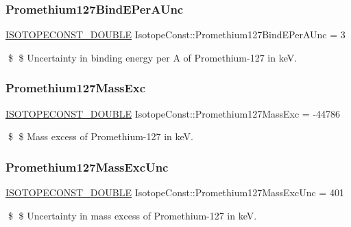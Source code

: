 \subsubsection{\texorpdfstring{Promethium127\+Bind\+E\+Per\+A\+Unc}{Promethium127BindEPerAUnc}}
{\footnotesize\ttfamily \mbox{\hyperlink{group___isotope_const-_macros_ga8f45a7272ce02c0b4c65c44636ed719a}{I\+S\+O\+T\+O\+P\+E\+C\+O\+N\+S\+T\+\_\+\+D\+O\+U\+B\+LE}} Isotope\+Const\+::\+Promethium127\+Bind\+E\+Per\+A\+Unc = 3}

\$ \$ Uncertainty in binding energy per A of Promethium-\/127 in keV. \mbox{\label{group___isotope_const-_promethium-_pm127_ga12c618d8406d4ec367de1925860785ff}} 
\subsubsection{\texorpdfstring{Promethium127\+Mass\+Exc}{Promethium127MassExc}}
{\footnotesize\ttfamily \mbox{\hyperlink{group___isotope_const-_macros_ga8f45a7272ce02c0b4c65c44636ed719a}{I\+S\+O\+T\+O\+P\+E\+C\+O\+N\+S\+T\+\_\+\+D\+O\+U\+B\+LE}} Isotope\+Const\+::\+Promethium127\+Mass\+Exc = -\/44786}

\$ \$ Mass excess of Promethium-\/127 in keV. \mbox{\label{group___isotope_const-_promethium-_pm127_ga92eadd91036a4d0863725507d2215783}} 
\subsubsection{\texorpdfstring{Promethium127\+Mass\+Exc\+Unc}{Promethium127MassExcUnc}}
{\footnotesize\ttfamily \mbox{\hyperlink{group___isotope_const-_macros_ga8f45a7272ce02c0b4c65c44636ed719a}{I\+S\+O\+T\+O\+P\+E\+C\+O\+N\+S\+T\+\_\+\+D\+O\+U\+B\+LE}} Isotope\+Const\+::\+Promethium127\+Mass\+Exc\+Unc = 401}

\$ \$ Uncertainty in mass excess of Promethium-\/127 in keV. \mbox{\label{group___isotope_const-_promethium-_pm127_gabc3bae6560ab392f4ce71a04b548930c}} 
